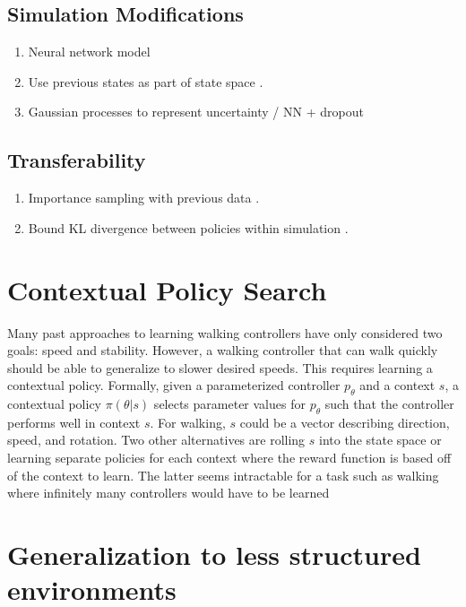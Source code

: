 \documentclass[12 pt]{article}
\begin{document}
\subsection{Simulation Modifications}

\begin{enumerate}
\item Neural network model
\item Use previous states as part of state space \cite{grasemann2008neural}.
\item Gaussian processes to represent uncertainty / NN + dropout
\end{enumerate}

\subsection{Transferability}

\begin{enumerate}
\item Importance sampling with previous data \cite{thomas2015off-policy}.
\item Bound KL divergence between policies within simulation \cite{schulman2015trust}.
\end{enumerate}

\section{Contextual Policy Search}

Many past approaches to learning walking controllers have only considered two goals: speed and stability. 
However, a walking controller that can walk quickly should be able to generalize to slower desired speeds. 
This requires learning a contextual policy.
Formally, given a parameterized controller $p_\theta$ and a context $s$, a contextual policy $\pi(\theta|s)$ selects parameter values for $p_\theta$ such that the controller performs well in context $s$.
For walking, $s$ could be a vector describing direction, speed, and rotation.
Two other alternatives are rolling $s$ into the state space or learning separate policies for each context where the reward function is based off of the context to learn.
The latter seems intractable for a task such as walking where infinitely many controllers would have to be learned

\section{Generalization to less structured environments}
\end{document}
